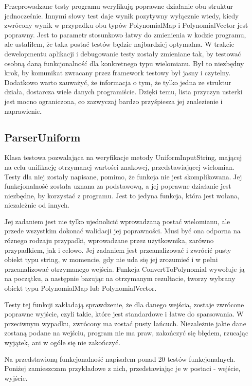 \documentclass[twoside,a4paper]{book}
\begin{document}
Przeprowadzane testy programu weryfikują poprawne działanie obu struktur jednocześnie. Innymi słowy test daje wynik pozytywny wyłącznie wtedy, kiedy zwrócony wynik w przypadku obu typów PolynomialMap i PolynomialVector jest poprawny. Jest to parametr stosunkowo łatwy do zmienienia w kodzie programu, ale ustaliłem, że taka postać testów będzie najbardziej optymalna. W trakcie dewelopmentu aplikacji i debugowanie testy zostały zmieniane tak, by testować osobną daną funkcjonalność dla konkretnego typu wielomianu. Był to niezbędny krok, by komunikat zwracany przez framework testowy był jasny i czytelny. Dodatkowo warto zauważyć, że informacja o tym, że tylko jedna ze struktur działa, dostarcza wiele danych programiście. Dzięki temu, lista przyczyn usterki jest mocno ograniczona, co zazwyczaj bardzo przyśpiesza jej znalezienie i naprawienie.

\subsection{ParserUniform}

Klasa testowa pozwalająca na weryfikacje metody UniformInputString, mającej na celu unifikację otrzymanej wartości znakowej, przedstawiającej wielomian. Testy dla niej zostały napisane, pomimo, że funkcja nie jest skomplikowana. Jej funkcjonalność została uznana za podstawową, a jej poprawne działanie jest niezbędne, by korzystać z programu. Jest to jedyna funkcja, która jest wołana, niezależnie od innych.

Jej zadaniem jest nie tylko ujednolicić wprowadzaną postać wielomianu, ale przede wszystkim dokonać walidacji jej poprawności. Musi być ona odporna na róznego rodzaju przypadki, wprowadzane przez użytkownika, zarówno przypadkiem, jak i celowo. Jej zadaniem jest przeanalizować i zwrócić pusty obiekt typu string, w momencie, gdy nie uda się jej zrozumieć i w pełni przeanalizować otrzymanego wejścia. Funkcja ConvertToPolynomial wywołuje ją na początku, a następnie bazując na otrzymanym rezultacie, tworzy wybrany obiekt typu PolynomialMap lub PolynomialVector.

Testy tej funkcji zakładają sprawdzenie, że dla danego wejścia, zostaje zwrócone poprawne wyjście, czyli takie, które jest standardowe i łatwe do sparsowania. W przeciwnym wypadku, zwrócony ma zostać pusty łańcuch. Niezależnie jakie dane zostaną podane na wejściu, program nie ma praw, zakończyć się błędem, rzucając wyjątek, ani w ogóle się nie zakończyć.

Na przedstawioną funkcjonalność napisałem ponad 20 testów funkcjonalnych. Poniżej zamieszczam przykładowe z nich, przedstawiając je w postaci - wejście, wyjście. 
\end{document}
